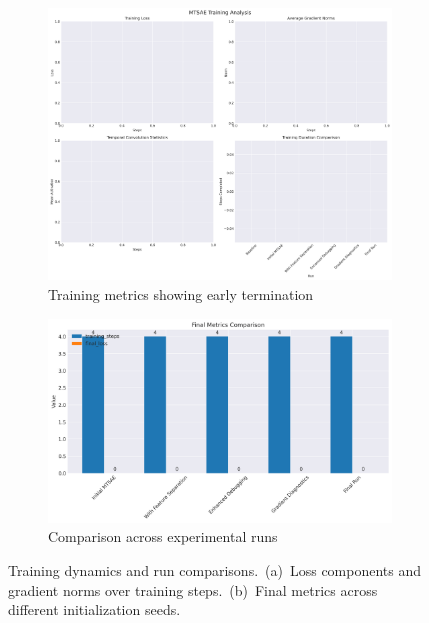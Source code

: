 \documentclass{article} %
\begin{document}
\begin{figure}[h]
    \centering
    \begin{subfigure}{0.49\textwidth}
        \includegraphics[width=\textwidth]{training_analysis.png}
        \caption{Training metrics showing early termination}
        \label{fig:training}
    \end{subfigure}
    \hfill
    \begin{subfigure}{0.49\textwidth}
        \includegraphics[width=\textwidth]{run_comparison.png}
        \caption{Comparison across experimental runs}
        \label{fig:comparison}
    \end{subfigure}
    \caption{Training dynamics and run comparisons.\ (a)\ Loss components and gradient norms over training steps.\ (b)\ Final metrics across different initialization seeds.}
    \label{fig:results}
\end{figure}
\end{document}
